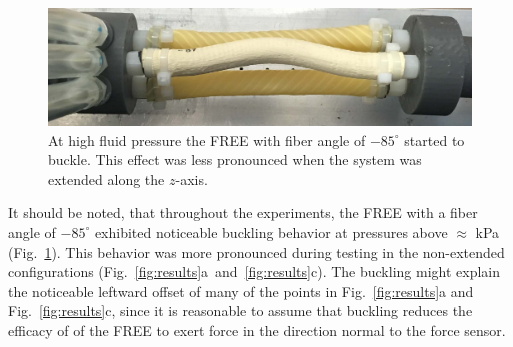 \begin{figure}
    \centering
    \includegraphics[width=\linewidth]{figures/photos/buckling.jpg}
    \caption{At high fluid pressure the FREE with fiber angle of $-85^\circ$ started to buckle.  This effect was less pronounced when the system was extended along the $z$-axis.}
    \label{fig:buckling}
\end{figure}


It should be noted, that throughout the experiments, the FREE with a fiber angle of $-85^\circ$ exhibited noticeable buckling behavior at pressures above $\approx$ \unit[50]{kPa} (Fig.~\ref{fig:buckling}). 
This behavior was more pronounced during testing in the non-extended configurations (Fig.~\ref{fig:results}a~and~\ref{fig:results}c). 
The buckling might explain the noticeable leftward offset of many of the points in Fig.~\ref{fig:results}a and Fig.~\ref{fig:results}c, since it is reasonable to assume that buckling reduces the efficacy of of the FREE to exert force in the direction normal to the force sensor. 

